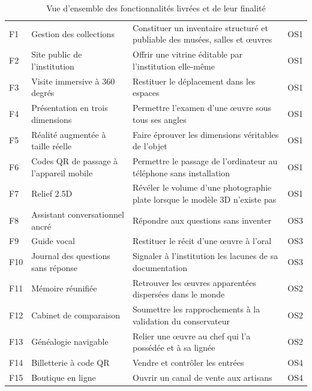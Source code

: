 \begin{table}[htbp]
\centering
\caption{Vue d'ensemble des fonctionnalités livrées et de leur finalité}
\label{tab:fonctionnalites}
\footnotesize
\begin{tabularx}{\textwidth}{|L{1.0cm}|L{4.0cm}|X|C{1.6cm}|}
\hline
{}
 &  &  &  \\ \hline
F1 & Gestion des collections & Constituer un inventaire structuré et publiable des musées, salles et œuvres & OS1 \\ \hline
F2 & Site public de l'institution & Offrir une vitrine éditable par l'institution elle-même & OS1 \\ \hline
F3 & Visite immersive à 360 degrés & Restituer le déplacement dans les espaces & OS1 \\ \hline
F4 & Présentation en trois dimensions & Permettre l'examen d'une œuvre sous tous ses angles & OS1 \\ \hline
F5 & Réalité augmentée à taille réelle & Faire éprouver les dimensions véritables de l'objet & OS1 \\ \hline
F6 & Codes QR de passage à l'appareil mobile & Permettre le passage de l'ordinateur au téléphone sans installation & OS1 \\ \hline
F7 & Relief 2.5D & Révéler le volume d'une photographie plate lorsque le modèle 3D n'existe pas & OS1 \\ \hline
F8 & Assistant conversationnel ancré & Répondre aux questions sans inventer & OS3 \\ \hline
F9 & Guide vocal & Restituer le récit d'une œuvre à l'oral & OS3 \\ \hline
F10 & Journal des questions sans réponse & Signaler à l'institution les lacunes de sa documentation & OS3 \\ \hline
F11 & Mémoire réunifiée & Retrouver les œuvres apparentées dispersées dans le monde & OS2 \\ \hline
F12 & Cabinet de comparaison & Soumettre les rapprochements à la validation du conservateur & OS2 \\ \hline
F13 & Généalogie navigable & Relier une œuvre au chef qui l'a possédée et à sa lignée & OS2 \\ \hline
F14 & Billetterie à code QR & Vendre et contrôler les entrées & OS4 \\ \hline
F15 & Boutique en ligne & Ouvrir un canal de vente aux artisans & OS4 \\ \hline

\end{tabularx}
\end{table}
